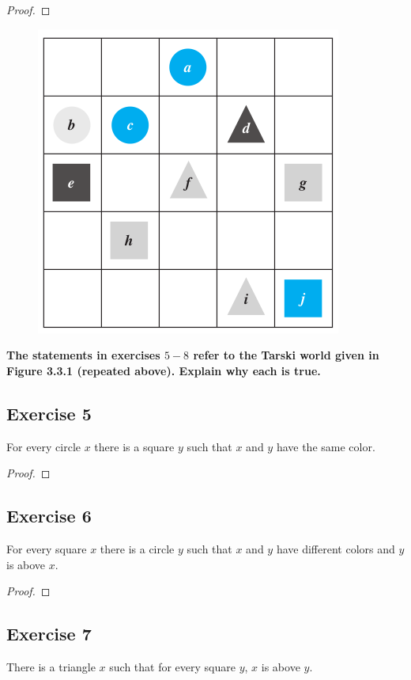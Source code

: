 \documentclass[14pt]{extarticle}
\begin{document}
\begin{proof}

\end{proof}

\begin{figure}[ht!]
\centering
\includegraphics[scale=0.4]{../images/3.3.1.png}
\end{figure}

{\bf \color{cyan} The statements in exercises $5-8$ refer to the Tarski world given in Figure 3.3.1 (repeated above). Explain why each is true.}

\subsection{Exercise 5}
For every circle $x$ there is a square $y$ such that $x$ and $y$ have the same color.

\begin{proof}

\end{proof}

\subsection{Exercise 6}
For every square $x$ there is a circle $y$ such that $x$ and $y$ have different colors and $y$ is above $x$.

\begin{proof}

\end{proof}

\subsection{Exercise 7}
There is a triangle $x$ such that for every square $y$, $x$ is above $y$.
\end{document}
